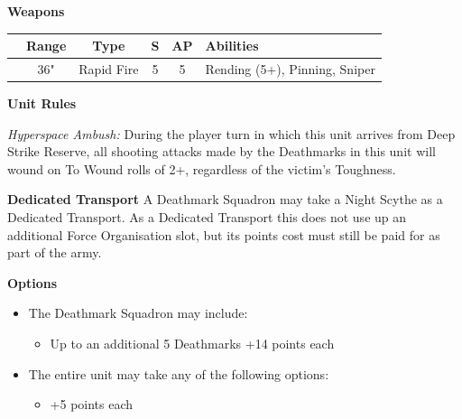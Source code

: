 \begin{minipage}[t]{0.72\textwidth}
	\vspace*{2em}
	\textbf{Weapons}
	
	\begin{tabular}{m{95 pt} *{4}{c} >{\raggedright\arraybackslash}p{130pt}}
		& Range & Type & S & AP & Abilities \\
		\hline
		\quickref{Synaptic Disintegrator} & 36" & Rapid Fire & 5 & 5 & Rending (5+), Pinning, Sniper \\
	\end{tabular}
	
	\vspace*{2em}
	\textbf{Unit Rules}
	
	\textit{Hyperspace Ambush:}  During the player turn in which this unit arrives from Deep Strike Reserve, all shooting attacks made by the Deathmarks in this unit will wound on To Wound rolls of 2+, regardless of the victim’s Toughness.
	
	\vspace*{2em}
	\textbf{Dedicated Transport}
	A Deathmark Squadron may take a Night Scythe as a Dedicated Transport. As a Dedicated Transport this does not use up an additional Force Organisation slot, but its points cost must still be paid for as part of the army.
	
	\vspace*{2em}
	\textbf{Options}
	\begin{itemize}
		\item The Deathmark Squadron may include:
		\begin{itemize}
			\item Up to an additional 5 Deathmarks \dotfill +14 points each
		\end{itemize}
		\item The entire unit may take any of the following options:
		\begin{itemize}
			\item {} \dotfill +5 points each
		\end{itemize}
	\end{itemize}
\end{minipage}
\hspace{0.5em}


\newpage
\subsubsection[C'Tan Shard of Aza'gorod, the Nightbringer]{}

